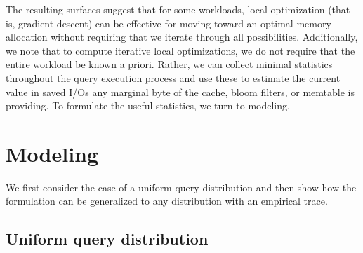 \documentclass{sig-alternate-05-2015}
\begin{document}
The resulting surfaces suggest that for some workloads, local optimization (that is, gradient descent) can be effective for moving toward an optimal memory allocation without requiring that we iterate through all possibilities. Additionally, we note that to compute iterative local optimizations, we do not require that the entire workload be known a priori. Rather, we can collect minimal statistics throughout the query execution process and use these to estimate the current value in saved I/Os any marginal byte of the cache, bloom filters, or memtable is providing. To formulate the useful statistics, we turn to modeling.

%

\section{Modeling}

We first consider the case of a uniform query distribution and then show how the formulation can be generalized to any distribution with an empirical trace.

\subsection{Uniform query distribution}
\end{document}
